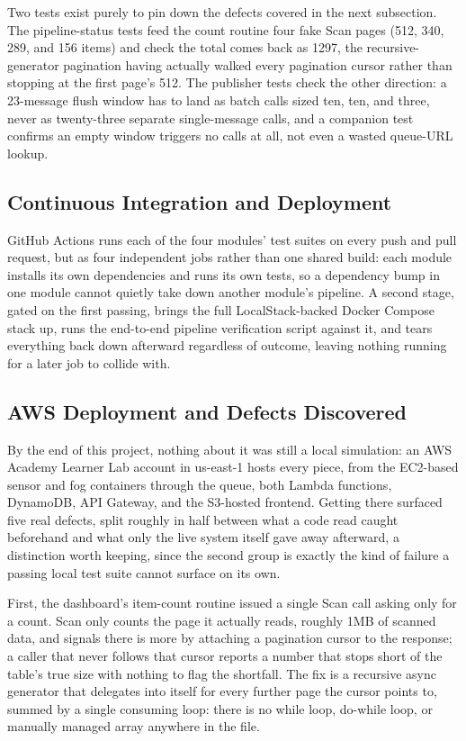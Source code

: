 \documentclass[conference]{IEEEtran}
\begin{document}
Two tests exist purely to pin down the defects covered in the next subsection. The pipeline-status tests feed the count routine four fake Scan pages (512, 340, 289, and 156 items) and check the total comes back as 1297, the recursive-generator pagination having actually walked every pagination cursor rather than stopping at the first page's 512. The publisher tests check the other direction: a 23-message flush window has to land as batch calls sized ten, ten, and three, never as twenty-three separate single-message calls, and a companion test confirms an empty window triggers no calls at all, not even a wasted queue-URL lookup.

\subsection{Continuous Integration and Deployment}
GitHub Actions runs each of the four modules' test suites on every push and pull request, but as four independent jobs rather than one shared build: each module installs its own dependencies and runs its own tests, so a dependency bump in one module cannot quietly take down another module's pipeline. A second stage, gated on the first passing, brings the full LocalStack-backed Docker Compose stack up, runs the end-to-end pipeline verification script against it, and tears everything back down afterward regardless of outcome, leaving nothing running for a later job to collide with.

\subsection{AWS Deployment and Defects Discovered}
By the end of this project, nothing about it was still a local simulation: an AWS Academy Learner Lab account in us-east-1 hosts every piece, from the EC2-based sensor and fog containers through the queue, both Lambda functions, DynamoDB, API Gateway, and the S3-hosted frontend. Getting there surfaced five real defects, split roughly in half between what a code read caught beforehand and what only the live system itself gave away afterward, a distinction worth keeping, since the second group is exactly the kind of failure a passing local test suite cannot surface on its own.

First, the dashboard's item-count routine issued a single Scan call asking only for a count. Scan only counts the page it actually reads, roughly 1MB of scanned data, and signals there is more by attaching a pagination cursor to the response; a caller that never follows that cursor reports a number that stops short of the table's true size with nothing to flag the shortfall. The fix is a recursive async generator that delegates into itself for every further page the cursor points to, summed by a single consuming loop: there is no while loop, do-while loop, or manually managed array anywhere in the file.
\end{document}
